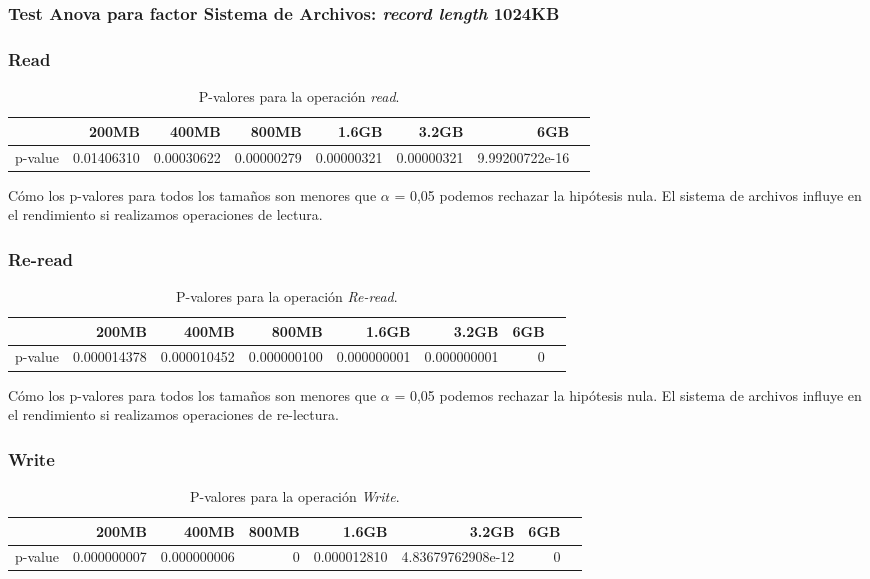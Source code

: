 \subsubsection{Test Anova para factor Sistema de Archivos: \textit{record length} 1024KB}

\subsubsection{Read}
\begin{table}[!htp]\centering
\scriptsize
\begin{tabular}{lrrrrrrr}\toprule
&200MB &400MB &800MB &1.6GB &3.2GB &6GB \\\midrule
p-value &0.01406310 &0.00030622 &0.00000279 &0.00000321 &0.00000321 &9.99200722e-16 \\
\bottomrule
\end{tabular}
\caption{P-valores para la operación \textit{read}.}\label{tab: }
\end{table}

Cómo los p-valores para todos los tamaños son menores que $\alpha$ = 0,05 podemos rechazar la hipótesis nula. El sistema de archivos influye en el rendimiento si realizamos operaciones de lectura. 

\subsubsection{Re-read}
\begin{table}[!htp]\centering
\scriptsize
\begin{tabular}{lrrrrrrr}\toprule
&200MB &400MB &800MB &1.6GB &3.2GB &6GB \\\midrule
p-value &0.000014378 &0.000010452 &0.000000100 &0.000000001 &0.000000001 &0 \\
\bottomrule
\end{tabular}
\caption{P-valores para la operación \textit{Re-read}.}\label{tab: }
\end{table}

Cómo los p-valores para todos los tamaños son menores que $\alpha$ = 0,05 podemos rechazar la hipótesis nula. El sistema de archivos influye en el rendimiento si realizamos operaciones de re-lectura. 


\subsubsection{Write}
\begin{table}[!htp]\centering
\scriptsize
\begin{tabular}{lrrrrrrr}\toprule
&200MB &400MB &800MB &1.6GB &3.2GB &6GB \\\midrule
p-value &0.000000007 &0.000000006 &0 &0.000012810 &4.83679762908e-12 &0\\
\bottomrule
\end{tabular}
\caption{P-valores para la operación \textit{Write}.}\label{tab: }
\end{table}

